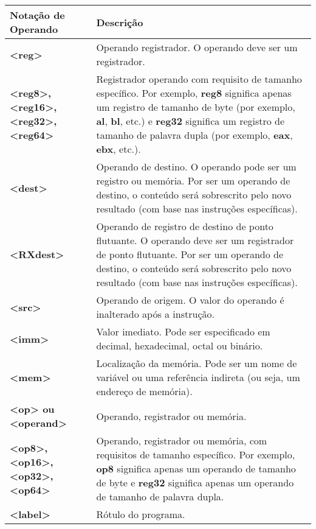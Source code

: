 {\centering
	\begin{table}[ht]
		\centering
		\begin{tabular}{|p{3cm}|p{9cm}|}
			\hline
			\rowcolor[HTML]{C0C0C0} 
			{\color[HTML]{000000} } Notação de Operando & {\color[HTML]{000000} }Descrição \\ \hline
			\textbf{<reg>}& Operando registrador. O operando deve ser um registrador. \\ \hline
			\textbf{<reg8>,<reg16>, <reg32>,<reg64>} & Registrador operando com requisito de tamanho específico. Por exemplo, \textbf{reg8} significa apenas um registro de tamanho de byte (por exemplo, \textbf{al}, \textbf{bl}, etc.) e \textbf{reg32} significa um registro de tamanho de palavra dupla (por exemplo, \textbf{eax}, \textbf{ebx}, etc.).\\ \hline
			\textbf{<dest>} & Operando de destino. O operando pode ser um registro ou memória. Por ser um operando de destino, o conteúdo será sobrescrito pelo novo resultado (com base nas instruções específicas).\\ \hline
			\textbf{<RXdest>} & Operando de registro de destino de ponto flutuante. O operando deve ser um registrador de ponto flutuante. Por ser um operando de destino, o conteúdo será sobrescrito pelo novo resultado (com base nas instruções específicas).\\ \hline
			\textbf{<src>} & Operando de origem. O valor do operando é inalterado após a instrução.\\ \hline
			\textbf{<imm>} & Valor imediato. Pode ser especificado em decimal, hexadecimal, octal ou binário.\\ \hline
			\textbf{<mem>} & Localização da memória. Pode ser um nome de variável ou uma referência indireta (ou seja, um endereço de memória).\\ \hline
			\textbf{<op> ou <operand>} & Operando, registrador ou memória.\\ \hline
			\textbf{<op8>,<op16>, <op32>,<op64>} & Operando, registrador ou memória, com requisitos de tamanho específico. Por exemplo, \textbf{op8} significa apenas um operando de tamanho de byte e \textbf{reg32} significa apenas um operando de tamanho de palavra dupla.\\ \hline
			\textbf{<label>} & Rótulo do programa.\\ \hline
		\end{tabular}
		\caption{}
		\label{notacao}
	\end{table}
}
